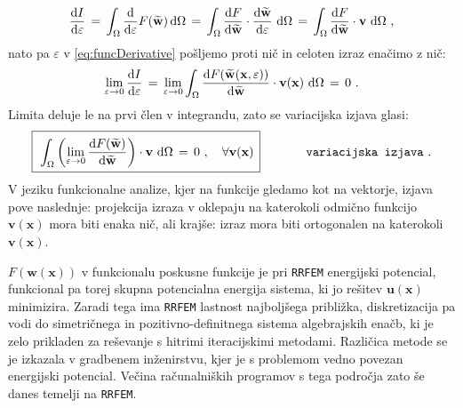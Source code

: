 \begin{equation}
	\frac{\mathrm{d} I}{\mathrm{d} \varepsilon} \, =
	\, \int_{\Omega} \frac{\mathrm{d}}{\mathrm{d} \varepsilon} F(\widetilde{\mathbf{w}}) \, \mathrm{d} \Omega \, =
	\, \int_{\Omega} \frac{\mathrm{d} F}{\mathrm{d} \widetilde{\mathbf{w}}} \cdot \frac{\mathrm{d} \widetilde{\mathbf{w}}}{\mathrm{d} \varepsilon} \ \mathrm{d} \Omega \, =
	\, \int_{\Omega} \frac{\mathrm{d} F}{\mathrm{d} \widetilde{\mathbf{w}}} \cdot \mathbf{v} \ \mathrm{d} \Omega \ ,
\label{eq:funcDerivative}
\end{equation}
nato pa $\varepsilon$ v \eqref{eq:funcDerivative} pošljemo proti nič in celoten izraz enačimo z nič:
\begin{equation}
	\lim_{\varepsilon \rightarrow 0} \frac{\mathrm{d} I}{\mathrm{d} \varepsilon} \, = \, \lim_{\varepsilon \rightarrow 0} \int_{\Omega} \frac{\mathrm{d} F(\widetilde{\mathbf{w}}(\mathbf{x}, \varepsilon))}{\mathrm{d} \widetilde{\mathbf{w}}} \cdot \mathbf{v(\mathbf{x})} \ \mathrm{d} \Omega \, = \, 0 \ .
\end{equation}
Limita deluje le na prvi člen v integrandu, zato se variacijska izjava glasi:
\begin{equation}
	\boxed{\, \vphantom{\bigg)^2_3}
		\int_{\Omega} \left( \lim_{\varepsilon \rightarrow 0} \frac{\mathrm{d} F(\widetilde{\mathbf{w}})}{\mathrm{d} \widetilde{\mathbf{w}}} \right) \cdot \mathbf{v} \ \mathrm{d} \Omega \, = \, 0 \ , \quad \forall \mathbf{v(\mathbf{x})}\,
	}
	\hspace{1.3cm} \texttt{variacijska izjava} \ .
	\label{eq:variationalStatement}
\end{equation}
V jeziku funkcionalne analize, kjer na funkcije gledamo kot na vektorje, izjava pove naslednje: projekcija izraza v oklepaju na katerokoli odmično funkcijo $\mathbf{v(x)}$ mora biti enaka nič, ali krajše: izraz mora biti ortogonalen na katerokoli $\mathbf{v(x)}$.

$F\left(\mathbf{w}(\mathbf{x})\right)$ v funkcionalu poskusne funkcije je pri \texttt{RRFEM} energijski potencial, funkcional pa torej skupna potencialna energija sistema, ki jo rešitev $\mathbf{u}(\mathbf{x})$ minimizira. Zaradi tega ima \texttt{RRFEM} last\-nost najboljšega približka, diskretizacija pa vodi do simetričnega in pozitivno-definitnega sistema algebrajskih enačb, ki je zelo prikladen za reševanje s hitrimi iteracijskimi metodami. Različica metode se je izkazala v gradbenem inženirstvu, kjer je s problemom vedno povezan energijski potencial. Večina računalniških programov s tega področja zato še danes temelji na \texttt{RRFEM}.

